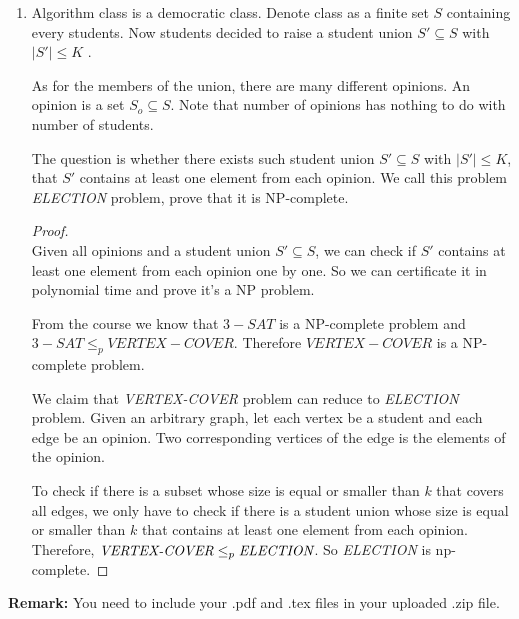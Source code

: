 \documentclass[12pt,a4paper]{article}
\theoremstyle{definition}
\begin{document}
\begin{enumerate}
\begin{proof}
		If we can find a subset of size $k$ in $G$ satisfies the requirement of CLIQUE, the we can assign true to each element in the subset so that $\phi$ is true which satisfies 3-SAT. Also we can prove this statement vice versa.
		
	
	\end{proof}

\item Algorithm class is a democratic class. Denote class as a finite set $S$ containing every students. Now students decided to raise a student union $S' \subseteq S$ with $|S'|\leq K$ .\par
As for the members of the union, there are many different opinions. An opinion is a set $S_o\subseteq S$. Note that number of opinions has nothing to do with number of students.\par
The question is whether there exists such student union $S' \subseteq S$ with $|S'|\leq K$, that $S'$ contains at least one element from each opinion. We call this problem \emph{ELECTION} problem, prove that it is NP-complete.

\begin{proof}
~\\
Given all opinions and a student union $S' \subseteq S$, we can check if $S'$ contains at least one element from each opinion one by one. So we can certificate it in polynomial time and prove it's a NP problem.

From the course we know that $3-SAT$ is a NP-complete problem and $3-SAT\le_pVERTEX-COVER$. Therefore $VERTEX-COVER$ is a NP-complete problem.

We claim that \emph{VERTEX-COVER} problem can reduce to \emph{ELECTION} problem. Given an arbitrary graph, let each vertex be a student and each edge be an opinion. Two corresponding vertices of the edge is the elements of the opinion.

To check if there is a subset whose size is equal or smaller than $k$ that covers all edges, we only have to check if there is a student union whose size is equal or smaller than $k$ that contains at least one element from each opinion. Therefore, $\emph{VERTEX-COVER}\le_p\emph{ELECTION}$. So \emph{ELECTION} is np-complete.
\end{proof}
\end{enumerate}

\vspace{20pt}

\textbf{Remark:} You need to include your .pdf and .tex files in your uploaded .zip file.

\end{document}
